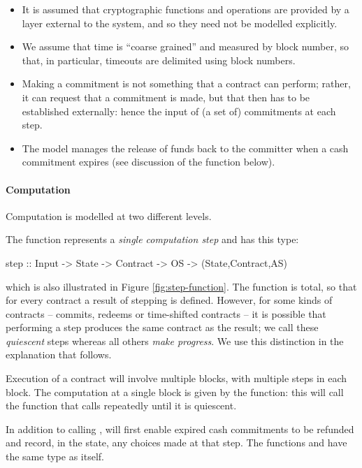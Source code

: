 \documentclass[runningheads]{llncs}
\begin{document}
\begin{itemize}
\item It is assumed that cryptographic functions and operations are provided by a layer external to the system, and so 
they need not be modelled explicitly.
\item We assume that time is ``coarse grained'' and measured by block number, so that, in particular, timeouts are 
delimited using block numbers. 
\item 
Making a commitment is not something that a contract can perform; rather, it 
can request that a commitment is made, but that then has to be established externally: hence the input of (a set of) 
commitments at each step.
\item The model manages the release of funds back to the committer when a cash commitment expires (see discussion of 
the  function below).
\end{itemize}

\paragraph{Computation}

Computation is modelled at two different levels. 

The  function represents a \emph{single computation step} and has this type:
\begin{haskellcode}
step :: Input -> State -> Contract -> OS -> (State,Contract,AS)
\end{haskellcode}
which is also illustrated in Figure \ref{fig:step-function}. 
The  function is total, so that for every contract a result of stepping is defined. However, for 
some kinds of contracts -- commits, redeems or time-shifted contracts -- it is possible that performing  a step produces the same contract as the result; we call these \emph{quiescent} steps whereas all others \emph{make 
progress}. We use this distinction in the explanation that follows.

Execution of a contract will involve multiple blocks, with multiple steps in each block. The computation at a single block is given by the  function: this will call the  function that calls  repeatedly
until it is quiescent. 

In addition to 
calling ,  will first enable expired cash commitments to be refunded and record, in the state, any choices made at that step. 
The functions  and  have the same type as  itself.
\end{document}
